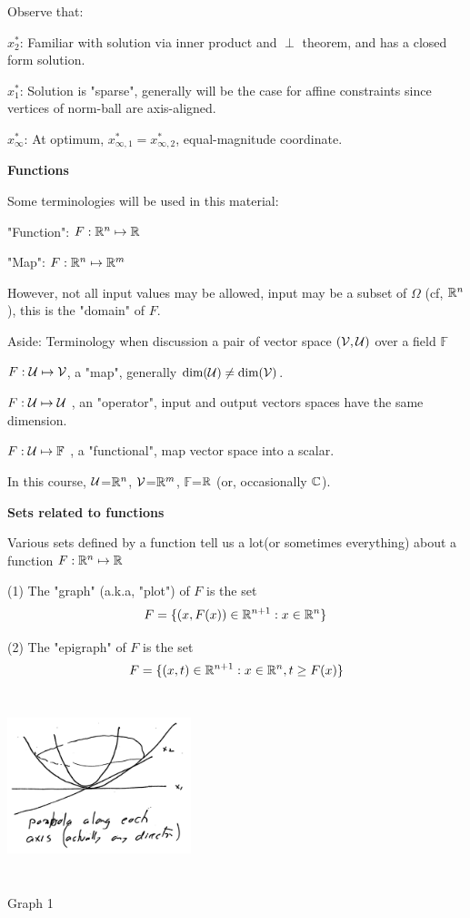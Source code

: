 Observe that:

$x_{2}^{*}$: Familiar with solution via inner product and $\perp$ theorem, and has a closed form solution.

$x_{1}^{*}$: Solution is "sparse", generally will be the case for affine constraints since vertices of norm-ball are axis-aligned.

$x_{\infty}^{*}$: At optimum, $x_{\infty, 1}^{*}=x_{\infty, 2}^{*}$, equal-magnitude coordinate.


\vspace{0.5cm}
\noindent\textbf{Functions}

Some terminologies will be used in this material:

"Function":  $F:\mathbb{R}^{n}\mapsto \mathbb{R}$

"Map":  $F:\mathbb{R}^{n}\mapsto \mathbb{R}^{m}$


However, not all input values may be allowed, input may be a subset of $\Omega$ (cf, $\mathbb{R}^{n}$), this is the "domain" of $F$.%

\vspace{0.5cm}
Aside: Terminology when discussion a pair of vector space $(\cal{V},\cal{U})$ over a field $\mathbb{F}$

$F:\cal{U}\mapsto \cal{V}$, a "map", generally $\text{dim}(\cal{U})\neq \text{dim}(\cal{V})$.

$F:\cal{U}\mapsto \cal{U}$ , an "operator", input and output vectors spaces have the same dimension.

$F:\cal{U}\mapsto \mathbb{F}$ , a "functional", map vector space into a scalar.

In this course, $\cal{U}$=$\mathbb{R}^{n}$, $\cal{V}$=$\mathbb{R}^{m}$, $\mathbb{F}$=$\mathbb{R}$ (or, occasionally $\mathbb{C}$).


\vspace{0.3cm}
\textbf{Sets related to functions}

Various sets defined by a function tell us a lot(or sometimes everything) about a function $F:\mathbb{R}^{n}\mapsto\mathbb{R}$

(1) The "graph" (a.k.a, "plot") of $F$ is the set
$$F=\{(x,F(x))\in\mathbb{R}^{n+1}:x\in\mathbb{R}^{n}\}$$

(2) The "epigraph" of $F$ is the set 
$$F=\{(x,t)\in\mathbb{R}^{n+1}:x\in\mathbb{R}^{n}, t\geq F(x) \}$$

\begin{marginfigure}
	\centering
	\includegraphics[width=2.1in,height=2.1in]{figures/ch02/p48-1.jpg}
	\caption{Graph 1} 
\end{marginfigure}

